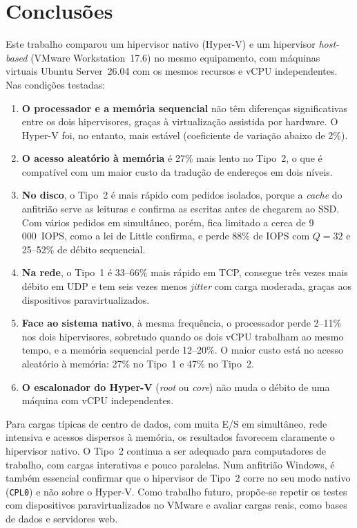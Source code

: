 \documentclass[conference]{IEEEtran}
\begin{document}
\section{Conclusões}\label{sec_concl}
Este trabalho comparou um hipervisor nativo (Hyper-V) e um hipervisor \textit{host-based} (VMware Workstation~17.6) no mesmo equipamento, com máquinas virtuais Ubuntu Server~26.04 com os mesmos recursos e vCPU independentes. Nas condições testadas:
\begin{enumerate}
\item \textbf{O processador e a memória sequencial} não têm diferenças significativas entre os dois hipervisores, graças à virtualização assistida por hardware. O Hyper-V foi, no entanto, mais estável (coeficiente de variação abaixo de 2\%).
\item \textbf{O acesso aleatório à memória} é 27\% mais lento no Tipo~2, o que é compatível com um maior custo da tradução de endereços em dois níveis.
\item \textbf{No disco}, o Tipo~2 é mais rápido com pedidos isolados, porque a \textit{cache} do anfitrião serve as leituras e confirma as escritas antes de chegarem ao SSD. Com vários pedidos em simultâneo, porém, fica limitado a cerca de 9\,000~IOPS, como a lei de Little confirma, e perde 88\% de IOPS com $Q=32$ e 25--52\% de débito sequencial.
\item \textbf{Na rede}, o Tipo~1 é 33--66\% mais rápido em TCP, consegue três vezes mais débito em UDP e tem seis vezes menos \textit{jitter} com carga moderada, graças aos dispositivos paravirtualizados.
\item \textbf{Face ao sistema nativo}, à mesma frequência, o processador perde 2--11\% nos dois hipervisores, sobretudo quando os dois vCPU trabalham ao mesmo tempo, e a memória sequencial perde 12--20\%. O maior custo está no acesso aleatório à memória: 27\% no Tipo~1 e 47\% no Tipo~2.
\item \textbf{O escalonador do Hyper-V} (\textit{root} ou \textit{core}) não muda o débito de uma máquina com vCPU independentes.
\end{enumerate}
Para cargas típicas de centro de dados, com muita E/S em simultâneo, rede intensiva e acessos dispersos à memória, os resultados favorecem claramente o hipervisor nativo. O Tipo~2 continua a ser adequado para computadores de trabalho, com cargas interativas e pouco paralelas. Num anfitrião Windows, é também essencial confirmar que o hipervisor de Tipo~2 corre no seu modo nativo (\texttt{CPL0}) e não sobre o Hyper-V. Como trabalho futuro, propõe-se repetir os testes com dispositivos paravirtualizados no VMware e avaliar cargas reais, como bases de dados e servidores web.
\end{document}
